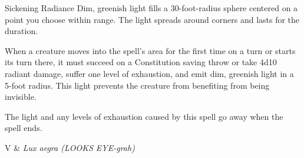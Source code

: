 \begin{Spell}[
  tags=Concentration,
  level={4th},
  time={1 action},
  range={120 ft/30 ft r sphere},
  components={V, S},
  duration={10 minutes},
  school={Evocation},
  attack={CON Save},
  effect={Radiant, Exhaustion}
]{Sickening Radiance}
Dim, greenish light fills a 30-foot-radius sphere centered on a point you choose within range. The light spreads around corners and lasts for the duration.

When a creature moves into the spell's area for the first time on a turn or starts its turn there, it must succeed on a Constitution saving throw or take 4d10 radiant damage, suffer one level of exhaustion, and emit dim, greenish light in a 5-foot radius. This light prevents the creature from benefiting from being invisible.

The light and any levels of exhaustion caused by this spell go away when the spell ends.

\begin{components}
V & \textit{Lux aegra (LOOKS EYE-grah)}
\end{components}
\end{Spell}



